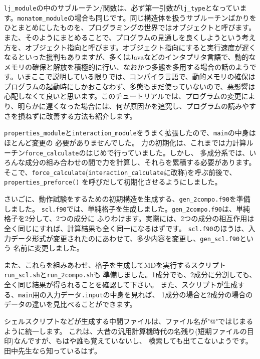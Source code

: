 \documentclass[a4,10pt]{article}
\begin{document}
\begin{shadebox}
    {\tt lj\_module}の中のサブルーチン/関数は、必ず第一引数が{\tt lj\_type}となっています。{\tt monatom\_module}の場合も同じです。同じ構造体を扱うサブルーチンばかりをひとまとめにしたものを、プログラミングの世界ではオブジェクトと呼びます。また、そのようにまとめることで、プログラムの見通しを良くしようという考え方を、オブジェクト指向と呼びます。オブジェクト指向にすると実行速度が遅くなるといった批判もありますが、多くはJavaなどのインタプリタ言語で、動的なメモリの確保と解放を積極的に行い、なおかつ多態を多用する場合の話のようです。いまここで説明している限りでは、コンパイラ言語で、動的メモリの確保はプログラムの起動時にしかおこなわず、多態もまだ使っていないので、悪影響は心配しなくて良いと思います。このチュートリアルでは、プログラムの変更により、明らかに遅くなった場合には、何が原因かを追究し、プログラムの読みやすさを損ねずに改善する方法も紹介します。
\end{shadebox}

{\tt properties\_module}と{\tt interaction\_module}をうまく拡張したので、{\tt main}の中身はほとんど変更の
必要がありませんでした。
力の初期化は、これまでは力計算ルーチン{\tt force\_calculate}のはじめで行っていました。しかし、
多成分系では、いろんな成分の組み合わせの間で力を計算し、それらを累積する必要があります。
そこで、{\tt force\_calculate}({\tt interaction\_calculate}に改称)を呼ぶ前後で、{\tt properties\_preforce()}
を呼びだして初期化させるようにしました。

さいごに、動作試験をするための初期構造を生成する、{\tt gen\_2compo.f90}を準備しました。
{\tt scl.f90}では、単純格子を生成しました。{\tt gen\_2compo.f90}は、単純格子を2分して、2つの成分に
ふりわけます。実際には、2つの成分の相互作用は全く同じにすれば、計算結果も全く同一になるはずです。
{\tt scl.f90}のほうは、入力データ形式が変更されたのにあわせて、多少内容を変更し、{\tt gen\_scl.f90}という
名前に変更しました。

また、これらを組みあわせ、格子を生成してMDを実行するスクリプト{\tt run\_scl.sh}と{\tt run\_2compo.sh}も
準備しました。1成分でも、2成分に分割しても、全く同じ結果が得られることを確認して下さい。
また、スクリプトが生成する、{\tt main}用の入力データ{\tt *.input}の中身を見れば、
1成分の場合と2成分の場合のデータの違いを見比べることができます。

\begin{shadebox}
    シェルスクリプトなどが生成する中間ファイルは、ファイル名が"@"ではじまるように統一します。
    これは、大昔の汎用計算機時代の名残り(短期ファイルの目印)なんですが、もはや誰も覚えていないし、
    検索しても出てこないようです。田中先生なら知っているはず。
\end{shadebox}
\end{document}
